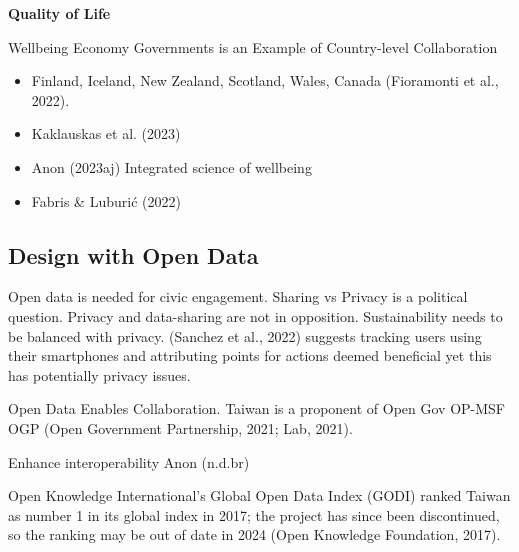 \documentclass[
  letterpaper,
  DIV=11,
  numbers=noendperiod]{scrartcl}
\providecommand{\tightlist}{%
  \setlength{\itemsep}{0pt}\setlength{\parskip}{0pt}}\usepackage{longtable,booktabs,array}
\begin{document}
\textbf{Quality of Life}

Wellbeing Economy Governments is an Example of Country-level
Collaboration

\begin{itemize}
\tightlist
\item
  Finland, Iceland, New Zealand, Scotland, Wales, Canada (Fioramonti et
  al., 2022).
\item
  Kaklauskas et al. (2023)
\item
  Anon (2023aj) Integrated science of wellbeing
\item
  Fabris \& Luburić (2022)
\end{itemize}

\subsection{Design with Open Data}\label{design-with-open-data}

Open data is needed for civic engagement. Sharing vs Privacy is a
political question. Privacy and data-sharing are not in opposition.
Sustainability needs to be balanced with privacy. (Sanchez et al., 2022)
suggests tracking users using their smartphones and attributing points
for actions deemed beneficial yet this has potentially privacy issues.

Open Data Enables Collaboration. Taiwan is a proponent of Open Gov
OP-MSF OGP (Open Government Partnership, 2021; Lab, 2021).

Enhance interoperability Anon (n.d.br)

Open Knowledge International's Global Open Data Index (GODI) ranked
Taiwan as number 1 in its global index in 2017; the project has since
been discontinued, so the ranking may be out of date in 2024 (Open
Knowledge Foundation, 2017).
\end{document}
